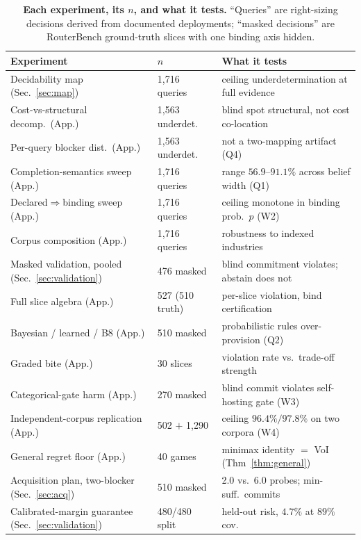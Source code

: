 \documentclass{article} %
\begin{document}
\begin{table}[h]
\centering
\caption{\textbf{Each experiment, its $n$, and what it tests.} ``Queries'' are right-sizing decisions derived from documented deployments; ``masked decisions'' are RouterBench ground-truth slices with one binding axis hidden.}
\label{tab:nmap}
\footnotesize
\setlength{\tabcolsep}{4pt}
\begin{tabular}{lll}
\toprule
Experiment & $n$ & What it tests \\
\midrule
Decidability map (Sec.~\ref{sec:map}) & 1{,}716 queries & ceiling underdetermination at full evidence \\
Cost-vs-structural decomp.\ (App.) & 1{,}563 underdet.\ & blind spot structural, not cost co-location \\
Per-query blocker dist.\ (App.) & 1{,}563 underdet.\ & not a two-mapping artifact (Q4) \\
Completion-semantics sweep (App.) & 1{,}716 queries & range $56.9$--$91.1\%$ across belief width (Q1) \\
Declared$\Rightarrow$binding sweep (App.) & 1{,}716 queries & ceiling monotone in binding prob.\ $p$ (W2) \\
Corpus composition (App.) & 1{,}716 queries & robustness to indexed industries \\
Masked validation, pooled (Sec.~\ref{sec:validation}) & 476 masked & blind commitment violates; abstain does not \\
Full slice algebra (App.) & 527 (510 truth) & per-slice violation, bind certification \\
Bayesian / learned / B8 (App.) & 510 masked & probabilistic rules over-provision (Q2) \\
Graded bite (App.) & 30 slices & violation rate vs.\ trade-off strength \\
Categorical-gate harm (App.) & 270 masked & blind commit violates self-hosting gate (W3) \\
Independent-corpus replication (App.) & 502 $+$ 1{,}290 & ceiling $96.4\%/97.8\%$ on two corpora (W4) \\
General regret floor (App.) & 40 games & minimax identity $=$ VoI (Thm~\ref{thm:general}) \\
Acquisition plan, two-blocker (Sec.~\ref{sec:acq}) & 510 masked & 2.0 vs.\ 6.0 probes; min-suff.\ commits \\
Calibrated-margin guarantee (Sec.~\ref{sec:validation}) & 480/480 split & held-out risk, $4.7\%$ at $89\%$ cov.\ \\
\bottomrule
\end{tabular}
\end{table}
\end{document}
